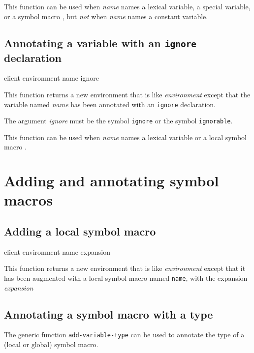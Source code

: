 This function can be used when \textit{name} names a lexical variable,
a special variable, or a symbol macro
, but \emph{not}
when \textit{name} names a constant variable.

\subsection{Annotating a variable with an \texttt{ignore} declaration}
\label{sec-annotating-a-variable-with-ignore}

{\footnotesize
{} {client environment name ignore}
}

This function returns a new environment that is like
\textit{environment} except that the variable named \textit{name} has
been annotated with an \texttt{ignore} declaration.

The argument \textit{ignore} must be the symbol \texttt{ignore} or the
symbol \texttt{ignorable}.

This function can be used when \textit{name} names a lexical variable
or a local symbol macro
.

\section{Adding and annotating symbol macros}

\subsection{Adding a local symbol macro}

{\footnotesize
{} {client environment name expansion}
}

This function returns a new environment that is like
\textit{environment} except that it has been augmented with a local
symbol macro named \texttt{name}, with the expansion
\textit{expansion}

\subsection{Annotating a symbol macro with a type}
\label{sec-annotating-a-symbol-macro-with-a-type}

The generic function \texttt{add-variable-type}
 can be used to annotate
the type of a (local or global) symbol macro.

